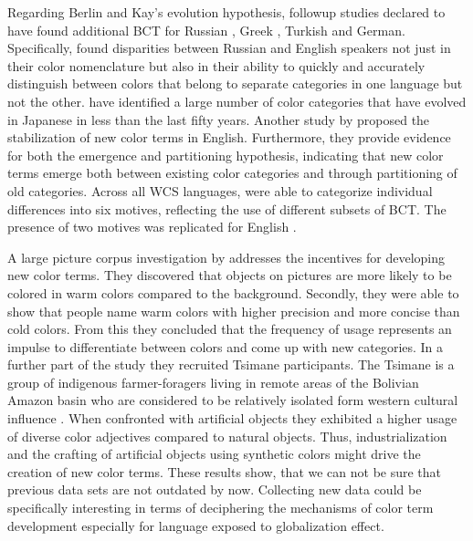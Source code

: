 Regarding Berlin and Kay's evolution hypothesis, followup studies declared to have found additional BCT for Russian \parencite{daviesBasic1994}, Greek \parencite{thierryUnconscious2009}, Turkish \parencite{ozgenTurkish1998} and German\parencite{zollingerWhy1984}.
Specifically, \textcite{winawerRussian2007} found disparities between Russian and English speakers not just in their color nomenclature but also in their ability to quickly and accurately distinguish between colors that belong to separate categories in one language but not the other.
\textcite{kurikiModern2017} have identified a large number of color categories that have evolved in Japanese in less than the last fifty years.
Another study by \textcite{lindseyColor2014} proposed the stabilization of new color terms in English.
Furthermore, they provide evidence for both the emergence \parencite{levinsonYeli2000} and partitioning \parencite{kayLinguistic1978} hypothesis, indicating that new color terms emerge both between existing color categories and through partitioning of old categories.
Across all WCS languages, \textcite{lindsey2009World} were able to categorize individual differences into six motives, reflecting the use of different subsets of BCT. The presence of two motives was replicated for English \parencite{lindseyColor2014}.

A large picture corpus investigation by \textcite{gibsonColor2017} addresses the incentives for developing new color terms.
They discovered that objects on pictures are more likely to be colored in warm colors compared to the background.
Secondly, they were able to show that people name warm colors with higher precision and more concise than cold colors.
From this they concluded that the frequency of usage represents an impulse to differentiate between colors and come up with new categories.
In a further part of the study they recruited Tsimane participants. The Tsimane is a group of indigenous farmer-foragers living in remote areas of the Bolivian Amazon basin who are considered to be relatively isolated form western cultural influence \parencite{mcdermott2016indifference}.
When confronted with artificial objects they exhibited a higher usage of diverse color adjectives compared to natural objects.
Thus, industrialization and the crafting of artificial objects using synthetic colors might drive the creation of new color terms.
These results show, that we can not be sure that previous data sets are not outdated by now. Collecting new data could be specifically interesting in terms of deciphering the mechanisms of color term development especially for language exposed to globalization effect.



